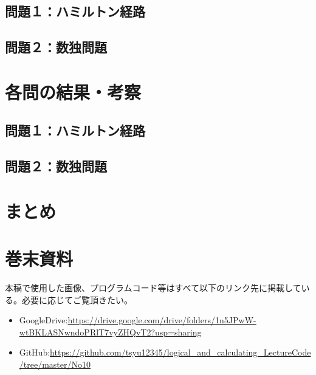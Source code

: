 \documentclass[dvipdfmx]{jsarticle}
\begin{document}
\subsection{問題１：ハミルトン経路}
\subsection{問題２：数独問題}

\section{各問の結果・考察}
\subsection{問題１：ハミルトン経路}
\subsection{問題２：数独問題}

\section{まとめ}
\section{巻末資料}
本稿で使用した画像、プログラムコード等はすべて以下のリンク先に掲載している。必要に応じてご覧頂きたい。
\begin{itemize}
  \item GoogleDrive:\url{https://drive.google.com/drive/folders/1n5JPwW-wtBKLASNwndoPRlT7vyZHQvT2?usp=sharing}
  \item GitHub:\url{https://github.com/tsyu12345/logical_and_calculating_LectureCode/tree/master/No10}
\end{itemize}
\end{document}
